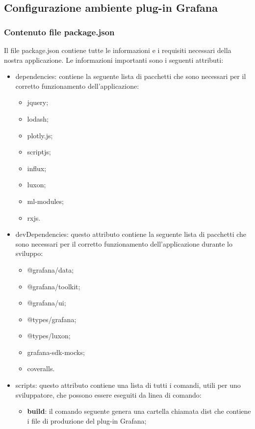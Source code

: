 \subsection{Configurazione ambiente plug-in Grafana}
\subsubsection{Contenuto file package.json}
Il file package.json contiene tutte le informazioni e i requisiti necessari della nostra applicazione. Le informazioni importanti sono i seguenti attributi:
\begin{itemize}
	\item dependencies: contiene la seguente lista di pacchetti che sono necessari per il corretto funzionamento dell'applicazione:
		\begin{itemize}
			\item jquery;
			\item lodash;
			\item plotly.js;
			\item scriptjs;
			\item influx;
			\item luxon;
			\item ml-modules;
			\item rxjs.
		\end{itemize}
	\item devDependencies: questo attributo contiene la seguente lista di pacchetti che sono necessari per il corretto funzionamento dell'applicazione durante lo sviluppo:
		\begin{itemize}
			\item @grafana/data;
			\item @grafana/toolkit;
			\item @grafana/ui;
			\item @types/grafana;
			\item @types/luxon;
			\item grafana-sdk-mocks;
			\item coveralls.
		\end{itemize}
	\item{scripts}: questo attributo contiene una lista di tutti i comandi, utili per uno sviluppatore, che possono essere eseguiti da linea di comando:
		\begin{itemize}
			\item \textbf{build}: il comando seguente genera una cartella chiamata dist che contiene i file di produzione del plug-in Grafana\glo;
			\begin{verbatim}

\end{verbatim}
\end{itemize}
\end{itemize}
